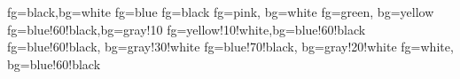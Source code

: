 \usepackage{amsmath}
\usepackage{amsfonts}
\usepackage{amssymb}

\usepackage{xcolor}

		{fg=black,bg=white} %
		{fg=blue}
		{fg=black}
  {fg=pink, bg=white}%
         {fg=green, bg=yellow}
			{fg=blue!60!black,bg=gray!10}%
				{fg=yellow!10!white,bg=blue!60!black}%
    {fg=blue!60!black, bg=gray!30!white}%
  {fg=blue!70!black, bg=gray!20!white}%
   {fg=white, bg=blue!60!black}%



\usepackage{hyperref}
